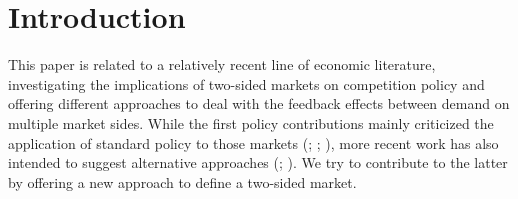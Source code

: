 \documentclass[10pt,a4paper]{scrreprt}
\begin{document}
\chapter{Introduction}

This paper is related to a relatively recent line of economic literature, investigating the implications of two-sided markets on competition policy and offering different approaches to deal with the feedback effects between demand on multiple market sides. While the first policy contributions mainly criticized the application of standard policy to those markets (\cite{wright_one-sided_2004}; \cite{leonello_horizontal_2010}; \cite{chandra_mergers_2009}), more recent work has also intended to suggest alternative approaches (\cite{argentesi_estimating_2007}; \cite{song_estimating_2015}). We try to contribute to the latter by offering a new approach to define a two-sided market. 
\end{document}
